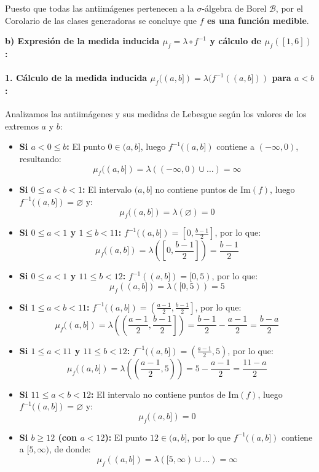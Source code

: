 \begin{problema}
Puesto que todas las antiimágenes pertenecen a la $\sigma$-álgebra de Borel $\mathcal{B}$, por el Corolario de las clases generadoras se concluye que \textbf{$f$ es una función medible}.

\textbf{b) Expresión de la medida inducida $\mu_f = \lambda \circ f^{-1}$ y cálculo de $\mu_f([1, 6])$:}

\paragraph{1. Cálculo de la medida inducida $\mu_f((a, b]) = \lambda(f^{-1}((a, b]))$ para $a < b$:}
Analizamos las antiimágenes y sus medidas de Lebesgue según los valores de los extremos $a$ y $b$:
\begin{itemize}
    \item \textbf{Si $a < 0 \le b$:} El punto $0 \in (a, b]$, luego $f^{-1}((a,b])$ contiene a $(-\infty, 0)$, resultando:
    \[
        \mu_f((a, b]) = \lambda((-\infty, 0) \cup \dots) = \infty
    \]
    \item \textbf{Si $0 \le a < b < 1$:} El intervalo $(a, b]$ no contiene puntos de $\mathrm{Im}(f)$, luego $f^{-1}((a,b]) = \varnothing$ y:
    \[
        \mu_f((a, b]) = \lambda(\varnothing) = 0
    \]
    \item \textbf{Si $0 \le a < 1$ y $1 \le b < 11$:} $f^{-1}((a, b]) = \left[0, \frac{b-1}{2}\right]$, por lo que:
    \[
        \mu_f((a, b]) = \lambda\left(\left[0, \frac{b-1}{2}\right]\right) = \frac{b-1}{2}
    \]
    \item \textbf{Si $0 \le a < 1$ y $11 \le b < 12$:} $f^{-1}((a, b]) = [0, 5)$, por lo que:
    \[
        \mu_f((a, b]) = \lambda([0, 5)) = 5
    \]
    \item \textbf{Si $1 \le a < b < 11$:} $f^{-1}((a, b]) = \left(\frac{a-1}{2}, \frac{b-1}{2}\right]$, por lo que:
    \[
        \mu_f((a, b]) = \lambda\left(\left(\frac{a-1}{2}, \frac{b-1}{2}\right]\right) = \frac{b-1}{2} - \frac{a-1}{2} = \frac{b-a}{2}
    \]
    \item \textbf{Si $1 \le a < 11$ y $11 \le b < 12$:} $f^{-1}((a, b]) = \left(\frac{a-1}{2}, 5\right)$, por lo que:
    \[
        \mu_f((a, b]) = \lambda\left(\left(\frac{a-1}{2}, 5\right)\right) = 5 - \frac{a-1}{2} = \frac{11-a}{2}
    \]
    \item \textbf{Si $11 \le a < b < 12$:} El intervalo no contiene puntos de $\mathrm{Im}(f)$, luego $f^{-1}((a,b]) = \varnothing$ y:
    \[
        \mu_f((a, b]) = 0
    \]
    \item \textbf{Si $b \ge 12$ (con $a < 12$):} El punto $12 \in (a, b]$, por lo que $f^{-1}((a,b])$ contiene a $[5, \infty)$, de donde:
    \[
        \mu_f((a, b]) = \lambda([5, \infty) \cup \dots) = \infty
    \]
\end{itemize}


\end{problema}
